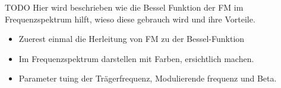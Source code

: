 TODO
Hier wird beschrieben wie die Bessel Funktion der FM im Frequenzspektrum hilft, wieso diese gebrauch wird und ihre Vorteile.
\begin{itemize}
    \item Zuerest einmal die Herleitung von FM zu der Bessel-Funktion
    \item Im Frequenzspektrum darstellen mit Farben, ersichtlich machen. 
    \item Parameter tuing der Trägerfrequenz, Modulierende frequenz und Beta. 
\end{itemize}





